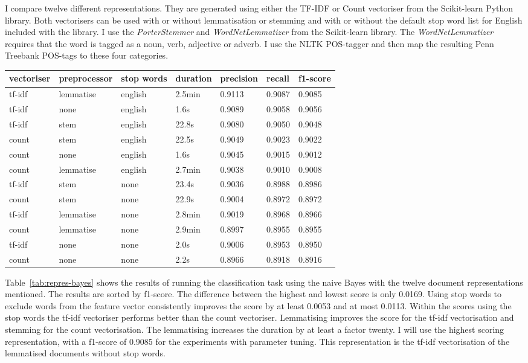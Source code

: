 \documentclass[11pt]{article}
\begin{document}
I compare twelve different representations. They are generated using either the TF-IDF or Count vectoriser from the Scikit-learn Python library. Both vectorisers can be used with or without lemmatisation or stemming and with or without the default stop word list for English included with the library. I use the \emph{PorterStemmer} and \emph{WordNetLemmatizer} from the Scikit-learn library. The \emph{WordNetLemmatizer} requires that the word is tagged as a noun, verb, adjective or adverb. I use the NLTK POS-tagger and then map the resulting Penn Treebank POS-tags to these four categories.

\begin{table*}[ht]\footnotesize
\centering
\begin{tabular}{ l l l l l l l }
vectoriser & preprocessor & stop words & duration & precision & recall & f1-score \\
\hline
tf-idf & lemmatise & english & 2.5min & 0.9113 & 0.9087 & 0.9085 \\
tf-idf & none & english & 1.6s & 0.9089 & 0.9058 & 0.9056 \\
tf-idf & stem & english & 22.8s & 0.9080 & 0.9050 & 0.9048 \\
count & stem & english & 22.5s & 0.9049 & 0.9023 & 0.9022 \\
count & none & english & 1.6s & 0.9045 & 0.9015 & 0.9012 \\
count & lemmatise & english & 2.7min & 0.9038 & 0.9010 & 0.9008 \\
tf-idf & stem & none & 23.4s & 0.9036 & 0.8988 & 0.8986 \\
count & stem & none & 22.9s & 0.9004 & 0.8972 & 0.8972 \\
tf-idf & lemmatise & none & 2.8min & 0.9019 & 0.8968 & 0.8966 \\
count & lemmatise & none & 2.9min & 0.8997 & 0.8955 & 0.8955 \\
tf-idf & none & none & 2.0s & 0.9006 & 0.8953 & 0.8950 \\
count & none & none & 2.2s & 0.8966 & 0.8918 & 0.8916 \\
\end{tabular}
\caption{scores for different representations and the naive Bayes classifier sorted by f1-score}
\label{tab:repres-bayes}
\end{table*}

Table~\ref{tab:repres-bayes} shows the results of running the classification task using the naive Bayes with the twelve document representations mentioned. The results are sorted by f1-score. The difference between the highest and lowest score is only 0.0169. Using stop words to exclude words from the feature vector consistently improves the score by at least 0.0053 and at most 0.0113. Within the scores using the stop words the tf-idf vectoriser performs better than the count vectoriser. Lemmatising improves the score for the tf-idf vectorisation and stemming for the count vectorisation. The lemmatising increases the duration by at least a factor twenty. I will use the highest scoring representation, with a f1-score of 0.9085 for the experiments with parameter tuning. This representation is the tf-idf vectorisation of the lemmatised documents without stop words.
\end{document}
